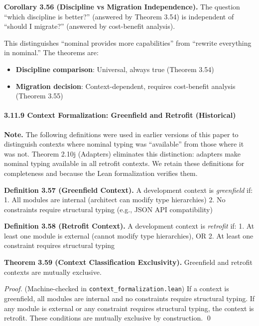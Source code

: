 \textbf{Corollary 3.56 (Discipline vs Migration Independence).} The
question ``which discipline is better?'' (answered by Theorem 3.54) is
independent of ``should I migrate?'' (answered by cost-benefit
analysis).

This distinguishes ``nominal provides more capabilities'' from ``rewrite everything
in nominal.'' The theorems are:
\begin{itemize}
\tightlist
\item \textbf{Discipline comparison}: Universal, always true (Theorem 3.54)
\item \textbf{Migration decision}: Context-dependent, requires cost-benefit
analysis (Theorem 3.55)
\end{itemize}

\paragraph{3.11.9 Context Formalization: Greenfield and Retrofit
(Historical)}\label{context-formalization-greenfield-and-retrofit-historical}

\textbf{Note.} The following definitions were used in earlier versions
of this paper to distinguish contexts where nominal typing was
``available'' from those where it was not. Theorem 2.10j (Adapters)
eliminates this distinction: adapters make nominal typing available in
all retrofit contexts. We retain these definitions for completeness and
because the Lean formalization verifies them.

\textbf{Definition 3.57 (Greenfield Context).} A development context is
\emph{greenfield} if: 1. All modules are internal (architect can modify
type hierarchies) 2. No constraints require structural typing (e.g.,
JSON API compatibility)

\textbf{Definition 3.58 (Retrofit Context).} A development context is
\emph{retrofit} if: 1. At least one module is external (cannot modify
type hierarchies), OR 2. At least one constraint requires structural
typing

\textbf{Theorem 3.59 (Context Classification Exclusivity).} Greenfield
and retrofit contexts are mutually exclusive.

\emph{Proof.} (Machine-checked in \texttt{context\_formalization.lean})
If a context is greenfield, all modules are internal and no constraints
require structural typing. If any module is external or any constraint
requires structural typing, the context is retrofit. These conditions
are mutually exclusive by construction. \qed

